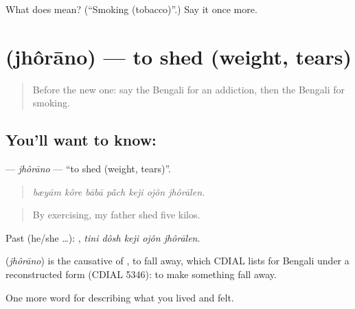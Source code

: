 \begin{tcolorbox}[breakable,colback=teal!4,colframe=teal!35!black,title={Before you move on}]
What does  mean? (\textquotedblleft{}Smoking (tobacco)\textquotedblright{}.) Say it once more.
\end{tcolorbox}
\section[\texorpdfstring{\bn{ঝরানো} (jhôrāno)}{ঝরানো (jhôrāno)}]{ (jhôrāno) — to shed (weight, tears)}

\label{lesson:BN-C480-jhorano}



\begin{quote}
Before the new one: say the Bengali for an addiction, then the Bengali for smoking.
\end{quote}

\subsection*{You'll want to know: }
\textbf{} — \emph{jhôrāno} — \textquotedblleft{}to shed (weight, tears)\textquotedblright{}.

\begin{quote}
      
\end{quote}

\begin{quote}
\emph{bæyām kôre bābā pā̃ch keji ojôn jhôrālen.}
\end{quote}

\begin{quote}
By exercising, my father shed five kilos.
\end{quote}

Past (he/she …):     , \emph{tini dôsh keji ojôn jhôrālen}.

\begin{cousinweb}
\textbf{} (\emph{jhôrāno}) is the causative of , to fall away, which CDIAL lists for Bengali under a reconstructed form (CDIAL 5346): to make something fall away.
\end{cousinweb}

\begin{grammarlens}[title={What you've built}]
One more word for describing what you lived and felt.
\end{grammarlens}

